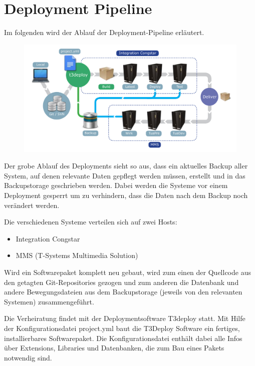 \documentclass[11pt,a4paper]{article} %
\begin{document}
\section{Deployment Pipeline} \label{sec:pipeline}

Im folgenden wird der Ablauf der Deployment-Pipeline erläutert. 

\begin{figure}[h]
\includegraphics[width=\textwidth]{images/DeploymentPipeline.pdf}
\centering
\end{figure}
 
Der grobe Ablauf des Deployments sieht so aus, dass ein aktuelles Backup aller System, auf denen relevante Daten gepflegt werden müssen, erstellt und in das Backupstorage geschrieben werden. Dabei werden die Systeme vor einem Deployment gesperrt um zu verhindern, dass die Daten nach dem Backup noch verändert werden. 


Die verschiedenen Systeme verteilen sich auf zwei Hosts:

\begin{itemize}
  \item Integration Congstar
  \item MMS (T-Systems Multimedia Solution)
\end{itemize}

Wird ein Softwarepaket komplett neu gebaut, wird zum einen der Quellcode aus den getagten Git-Repositories gezogen und zum anderen die Datenbank und andere Bewegungsdateien aus dem Backupstorage (jeweils von den relevanten Systemen) zusammengeführt. 

Die Verheiratung findet mit der Deploymentsoftware T3deploy statt. Mit Hilfe der Konfigurationsdatei project.yml baut die T3Deploy Software ein fertiges, installierbares Softwarepaket. Die Konfigurationsdatei 
enthält dabei alle Infos über Extensions, Libraries und Datenbanken, die zum Bau eines Pakets notwendig sind.
\end{document}
